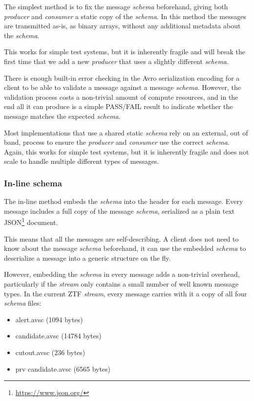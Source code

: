 \documentclass{article}
\newcommand{\json} {JSON\xspace}
\newcommand{\avro} {Avro\xspace}
\newcommand{\kfstream} {\textit{stream}\xspace}
\newcommand{\kfconsumer} {\textit{consumer}\xspace}
\newcommand{\kfproducer} {\textit{producer}\xspace}
\newcommand{\avschema} {\textit{schema}\xspace}
\newcommand{\deserz}    {deserialize\xspace}
\newcommand{\footurl}[1] {\footnote{\url{#1}}}
\begin{document}
The simplest method is to fix the message \avschema beforehand, giving both \kfproducer and \kfconsumer a static copy of the \avschema.  In this method the  messages are transmitted as-is, as binary arrays, without any additional metadata about the \avschema.

This works for simple test systems, but it is inherently fragile and will break the first time that we add a new  \kfproducer that uses a slightly different \avschema.

There is enough built-in error checking in the \avro serialization encoding for a client to be able to validate a message against a message \avschema. However, the validation process costs a non-trivial amount of compute resources, and in the end all it can produce is a simple PASS/FAIL result to indicate whether the message matches the expected \avschema.

Most implementations that use a shared static \avschema rely on an external, out of band, process to ensure the \kfproducer and \kfconsumer use the correct \avschema. Again, this works for simple test systems, but it is inherently fragile and does not scale to handle multiple different types of messages.

\subsubsection{In-line schema}
\label{avro-inline-schema}

The in-line method embeds the \avschema into the header for each message.
Every message includes a full copy of the message \avschema, serialized as a plain text \json\footurl{https://www.json.org/} document.

This means that all the messages are self-describing. A client does not need to know about the message \avschema beforehand, it can use the embedded \avschema to \deserz a message into a generic structure on the fly.

However, embedding the \avschema in every message adds a non-trivial overhead, particularly if the \kfstream only contains a small number of well known message types.
In the current ZTF \kfstream, every message carries with it a copy of all four \avschema files:

\begin{itemize}
  \item alert.avsc (1094 bytes)
  \item candidate.avsc (14784 bytes)
  \item cutout.avsc (236 bytes)
  \item prv candidate.avsc (6565 bytes)
\end{itemize}
\end{document}
